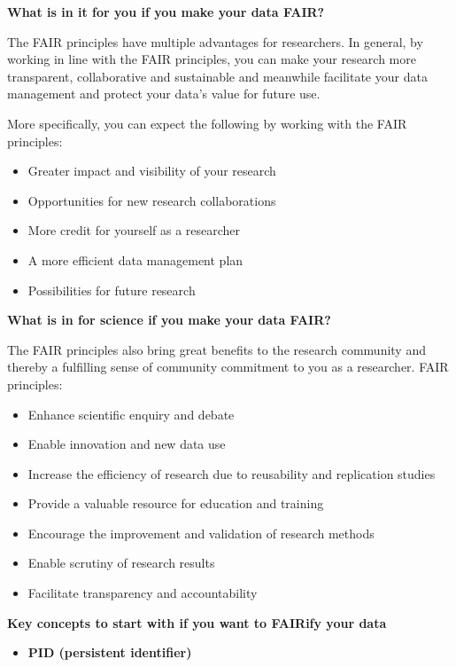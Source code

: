 \documentclass[
]{book}
\providecommand{\tightlist}{%
  \setlength{\itemsep}{0pt}\setlength{\parskip}{0pt}}
\begin{document}
\textbf{What is in it for you if you make your data FAIR?}

The FAIR principles have multiple advantages for researchers. In general, by working in line with the FAIR principles, you can make your research more transparent, collaborative and sustainable and meanwhile facilitate your data management and protect your data's value for future use.

More specifically, you can expect the following by working with the FAIR principles:

\begin{itemize}
\tightlist
\item
  Greater impact and visibility of your research
\item
  Opportunities for new research collaborations
\item
  More credit for yourself as a researcher
\item
  A more efficient data management plan
\item
  Possibilities for future research
\end{itemize}

\textbf{What is in for science if you make your data FAIR?}

The FAIR principles also bring great benefits to the research community and thereby a fulfilling sense of community commitment to you as a researcher. FAIR principles:

\begin{itemize}
\tightlist
\item
  Enhance scientific enquiry and debate
\item
  Enable innovation and new data use
\item
  Increase the efficiency of research due to reusability and replication studies
\item
  Provide a valuable resource for education and training
\item
  Encourage the improvement and validation of research methods
\item
  Enable scrutiny of research results
\item
  Facilitate transparency and accountability
\end{itemize}

\textbf{Key concepts to start with if you want to FAIRify your data}

\begin{itemize}
\tightlist
\item
  \textbf{PID (persistent identifier)}
\end{itemize}
\end{document}
